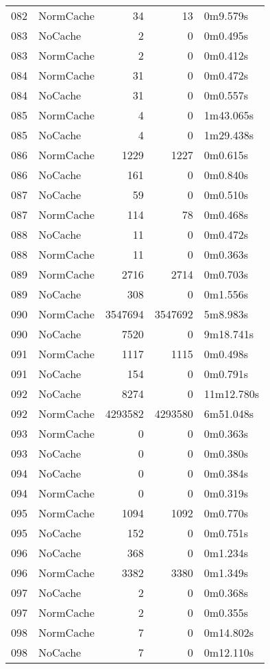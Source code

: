 \begin{tabular}{llrrl}
082 & NormCache & 34 & 13 & 0m9.579s \\
083 & NoCache & 2 & 0 & 0m0.495s \\
083 & NormCache & 2 & 0 & 0m0.412s \\
084 & NormCache & 31 & 0 & 0m0.472s \\
084 & NoCache & 31 & 0 & 0m0.557s \\
085 & NormCache & 4 & 0 & 1m43.065s \\
085 & NoCache & 4 & 0 & 1m29.438s \\
086 & NormCache & 1229 & 1227 & 0m0.615s \\
086 & NoCache & 161 & 0 & 0m0.840s \\
087 & NoCache & 59 & 0 & 0m0.510s \\
087 & NormCache & 114 & 78 & 0m0.468s \\
088 & NoCache & 11 & 0 & 0m0.472s \\
088 & NormCache & 11 & 0 & 0m0.363s \\
089 & NormCache & 2716 & 2714 & 0m0.703s \\
089 & NoCache & 308 & 0 & 0m1.556s \\
090 & NormCache & 3547694 & 3547692 & 5m8.983s \\
090 & NoCache & 7520 & 0 & 9m18.741s \\
091 & NormCache & 1117 & 1115 & 0m0.498s \\
091 & NoCache & 154 & 0 & 0m0.791s \\
092 & NoCache & 8274 & 0 & 11m12.780s \\
092 & NormCache & 4293582 & 4293580 & 6m51.048s \\
093 & NormCache & 0 & 0 & 0m0.363s \\
093 & NoCache & 0 & 0 & 0m0.380s \\
094 & NoCache & 0 & 0 & 0m0.384s \\
094 & NormCache & 0 & 0 & 0m0.319s \\
095 & NormCache & 1094 & 1092 & 0m0.770s \\
095 & NoCache & 152 & 0 & 0m0.751s \\
096 & NoCache & 368 & 0 & 0m1.234s \\
096 & NormCache & 3382 & 3380 & 0m1.349s \\
097 & NoCache & 2 & 0 & 0m0.368s \\
097 & NormCache & 2 & 0 & 0m0.355s \\
098 & NormCache & 7 & 0 & 0m14.802s \\
098 & NoCache & 7 & 0 & 0m12.110s \\

\end{tabular}
